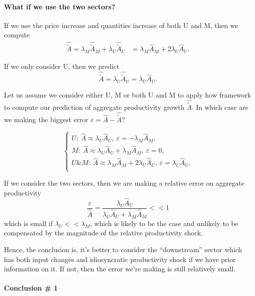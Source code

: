 \documentclass[11pt]{article}
\begin{document}
\paragraph{What if we use the two sectors?}
If we use the price increase and quantities increase of both U and M, then we compute
\begin{align*}
 \hat{\tilde{A}}=\lambda_M  \hat{\tilde{A}}_M +  \lambda_U  \hat{\tilde{A}}_U 
    &=
    \lambda_M  \hat{A}_M +  2\lambda_U  \hat{A}_U.
\end{align*}

If we only consider U, then we predict
\begin{equation*}
 \hat{\tilde{A}}=  \lambda_U  \hat{\tilde{A}}_U= \lambda_U  \hat{A}_U.
\end{equation*}

Let us assume we consider either U, M or both U and M to apply how framework to compute our prediction of aggregate productivity growth $\hat{\tilde{A}}$. In which case are we making the biggest error $\varepsilon=\hat{A}-\hat{\tilde{A}}$?

\begin{equation}
\begin{cases}
    U:~ \hat{A} \approx  \lambda_U  \hat{A}_U, ~\varepsilon= -\lambda_M  \hat{A}_M,\\
      M:~ \hat{A} \approx  \lambda_U \hat{A}_U+\lambda_M \hat{A}_M , ~\varepsilon= 0,\\
        U\&M:~ \hat{A} \approx  \lambda_M  \hat{A}_M +  2\lambda_U  \hat{A}_U , ~\varepsilon= \lambda_U  \hat{A}_U.\\
\end{cases}
\end{equation}

If we consider the two sectors, then we are making a relative error on aggregate productivity 
\begin{equation*}
   \frac{\varepsilon}{\hat{A}}= \frac{\lambda_U  \hat{A}_U}{ \lambda_U \hat{A}_U+\lambda_M \hat{A}_M}<<1
\end{equation*}
which is small if $\lambda_U<<\lambda_M$, which is likely to be the case and unlikely to be compensated by the magnitude of the relative productivity shock.

Hence, the conclusion is, it's better to consider the ``downstream'' sector which has both input changes and idiosyncratic productivity shock if we have prior information on it. If not, then the error we're making is still relatively small. 

\paragraph{Conclusion \# 1} 
\end{document}
